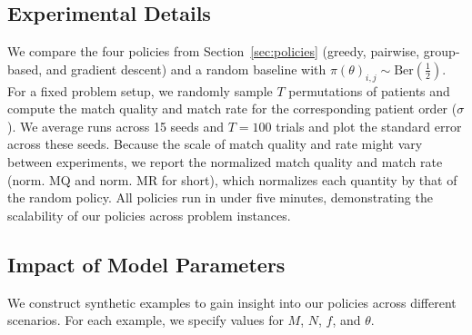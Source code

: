 \documentclass[11pt]{article}
\newtheorem{example}{Example}[section]
\newcommand{\hwcomment}[1]{{\color{blue} Holly: {#1}}}
\begin{document}
\subsection{Experimental Details}
We compare the four policies from Section~\ref{sec:policies} (greedy, pairwise, group-based, and gradient descent) and a random baseline with $\pi(\theta)_{i,j} \sim \text{Ber}(\frac{1}{2})$. 
For a fixed problem setup, we randomly sample $T$ permutations of patients and compute the match quality and match rate for the corresponding patient order ($\sigma$). We average runs across 15 seeds and $T=100$ trials and plot the standard error across these seeds. 
Because the scale of match quality and rate might vary between experiments, we report the normalized match quality and match rate (norm. MQ and norm. MR for short), which normalizes each quantity by that of the random policy.
All policies run in under five minutes, demonstrating the scalability of our policies across problem instances. 

\subsection{Impact of Model Parameters}
\label{sec:parameters}
We construct synthetic examples to gain insight into our policies across different scenarios. 
For each example, we specify values for $M$, $N$, $f$, and $\theta$. 


\end{document}
